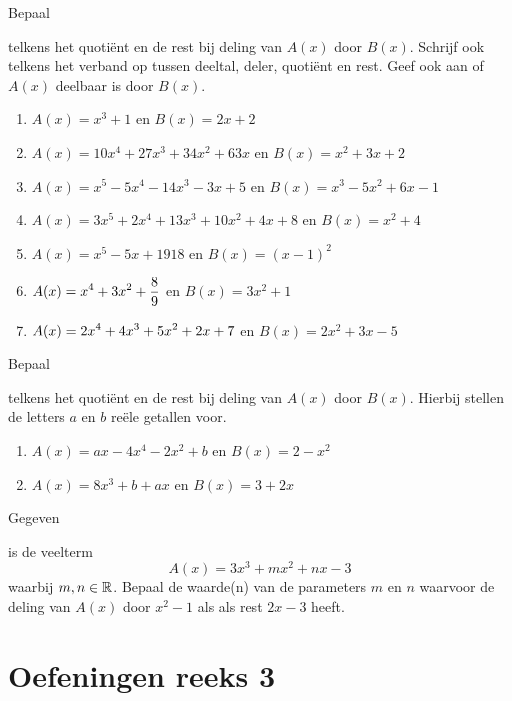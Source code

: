 \documentclass{ximera}
\begin{document}
\begin{exercise} 
\hypertarget{oef2.11}{Bepaal} telkens het quoti\"ent en de rest bij deling van $A(x)$ door $B(x)$. Schrijf ook telkens het verband op tussen deeltal, deler, quoti\"ent en rest. Geef ook aan of $A(x)$ deelbaar is door $B(x)$.
\begin{enumerate}
\item 
$A(x) = x^3+1$ \quad en \quad $B(x) = 2x+2$
\item
$A(x) = 10x^4 + 27x^3 + 34x^2 + 63x$ \quad en \quad $B(x) = x^2 + 3x + 2$ 
\item
$A(x) = x^5 - 5x^4 - 14x^3 - 3x + 5$ \quad en \quad $B(x) = x^3 - 5x^2 + 6x - 1$ 
\item
$A(x) = 3x^5 + 2x^4 + 13x^3 + 10x^2 + 4x + 8$ \quad en \quad $B(x) = x^2 + 4$ 
\item
$A(x) = x^5 - 5x + 1918$ \quad en \quad $B(x) = (x-1)^2$ 
\item
$\displaystyle A(x) = x^4 + 3x^2 + \frac{8}{9}$ en $B(x) = 3x^2 + 1$ 
\item
$\displaystyle A(x) = 2x^4 + 4x^3 + 5x^2 + 2x + 7$ en $B(x) = 2x^2+3x-5$ 
\end{enumerate}
\end{exercise} 

\begin{exercise} 
\hypertarget{oef2.12}{Bepaal} telkens het quoti\"ent en de rest bij deling van $A(x)$ door $B(x)$. Hierbij stellen de letters $a$ en $b$ re\"ele getallen voor. 
\begin{enumerate}
\item
$A(x) = ax - 4x^4 - 2x^2 + b$ en $B(x) = 2-x^2$ 
\item
$A(x) = 8x^3 + b + ax$ \quad en \quad $B(x) = 3+2x$ 
\end{enumerate}
\end{exercise} 

\begin{exercise} 
\hypertarget{oef2.13}{Gegeven} is de veelterm
\[
A(x) = 3x^3 + mx^2 + nx - 3
\]
waarbij $m,n \in \mathbb{R}$. Bepaal de waarde(n) van de parameters $m$ en $n$ waarvoor de deling van $A(x)$ door $x^2-1$ als als rest $2x-3$ heeft. 
\end{exercise} 














\section*{Oefeningen reeks 3}
\end{document}

